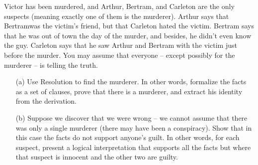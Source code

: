 \documentclass[a4paper, 11pt]{article}
\begin{document}
\begin{question}\normalfont
    Victor has been murdered, and Arthur, Bertram, and Carleton are the only suspects (meaning exactly one of them is the murderer). Arthur says that Bertramwas the victim's friend, but that Carleton hated the victim. Bertram says that he was out of town the day of the murder, and besides, he didn't even know the guy. Carleton says that he saw Arthur and Bertram with the victim just before the murder. You may assume that everyone – except possibly for the murderer – is telling the truth.
    \begin{itemize}
    \item [(a)] Use Resolution to find the murderer. In other words, formalize the facts as a set of clauses, prove that there is a murderer, and extract his identity from the derivation.
    \item [(b)] Suppose we discover that we were wrong – we cannot assume that there was only a single murderer (there may have been a conspiracy). Show that in this case the facts do not support anyone's guilt. In other words, for each suspect, present a logical interpretation that supports all the facts but where that suspect is innocent and the other two are guilty.
    \end{itemize}
\end{question}
\end{document}
